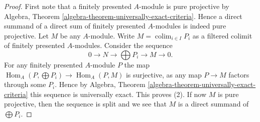 \documentclass{stacks-project}
\theoremstyle{plain}
\theoremstyle{definition}
\theoremstyle{remark}
\numberwithin{equation}{subsection}
\def\colim{\mathop{\mathrm{colim}}\nolimits}
\def\Hom{\mathop{\mathrm{Hom}}\nolimits}
\begin{document}
\begin{proof}
First note that a finitely presented $A$-module is pure projective by
Algebra, Theorem \ref{algebra-theorem-universally-exact-criteria}.
Hence a direct summand of a direct sum of finitely presented $A$-modules
is indeed pure projective. Let $M$ be any $A$-module.
Write $M = \colim_{i \in I} P_i$ as a filtered colimit of
finitely presented $A$-modules. Consider the sequence
$$
0 \to N \to \bigoplus P_i \to M \to 0.
$$
For any finitely presented $A$-module $P$ the map
$\Hom_A(P, \bigoplus P_i) \to \Hom_A(P, M)$
is surjective, as any map $P \to M$ factors through some $P_i$.
Hence by
Algebra, Theorem \ref{algebra-theorem-universally-exact-criteria}
this sequence is universally exact. This proves (2).
If now $M$ is pure projective, then the sequence is split and
we see that $M$ is a direct summand of $\bigoplus P_i$.
\end{proof}
\end{document}
